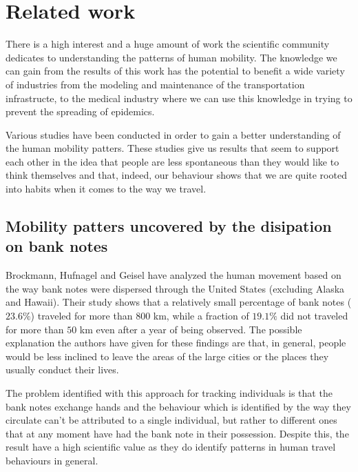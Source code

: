 \chapter{Related work}
\label{relatedwork}
There is a high interest and a huge amount of work the scientific community
dedicates to understanding the patterns of human mobility. The knowledge we can
gain from the results of this work has the potential to benefit a wide variety
of industries from the modeling and maintenance of the transportation
infrastructe, to the medical industry where we can use this knowledge in trying
to prevent the spreading of epidemics. \cite{Brockmann08} %

Various studies have been conducted in order to gain a better understanding of
the human mobility patters. These studies give us results that seem to support
each other in the idea that people are less spontaneous than they would like to
think themselves and that, indeed, our behaviour shows that we are quite rooted
into habits when it comes to the way we travel.

\section{Mobility patters uncovered by the disipation on bank notes}
Brockmann, Hufnagel and Geisel\cite{Brockmann06} have analyzed the human movement
based on the way bank notes were dispersed through the United States (excluding
Alaska and Hawaii). Their study shows that a relatively small percentage of bank
notes ($23.6\%$) traveled for more than $800$ km, while a fraction of $19.1\%$
did not traveled for more than $50$ km even after a year of being observed. The
possible explanation the authors have given for these findings are that, in
general, people would be less inclined to leave the areas of the large cities or
the places they usually conduct their lives.

The problem identified with this approach for tracking individuals is that the
bank notes exchange hands and the behaviour which is identified by the way they
circulate can't be attributed to a single individual, but rather to different
ones that at any moment have had the bank note in their possession. Despite this,
the result have a high scientific value as they do identify patterns in human
travel behaviours in general.

